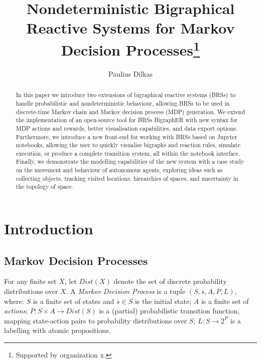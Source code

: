 \documentclass[runningheads]{llncs}
\newcommand\Dist{\mathit{Dist}}
\begin{document}
\title{Nondeterministic Bigraphical Reactive Systems for Markov Decision
  Processes\thanks{Supported by organization x.}}
\author{Paulius Dilkas}
\maketitle

\begin{abstract}
  In this paper we introduce two extensions of bigraphical reactive systems
  (BRSs) to handle probabilistic and nondeterministic behaviour, allowing BRSs
  to be used in discrete-time Markov chain and Markov decision process (MDP)
  generation. We extend the implementation of an open-source tool for BRSs
  BigraphER with new syntax for MDP actions and rewards, better visualisation
  capabilities, and data export options. Furthermore, we introduce a new
  front-end for working with BRSs based on Jupyter notebooks, allowing the user
  to quickly visualise bigraphs and reaction rules, simulate execution, or
  produce a complete transition system, all within the notebook interface.
  Finally, we demonstrate the modelling capabilities of the new system with a
  case study on the movement and behaviour of autonomous agents, exploring ideas
  such as collecting objects, tracking visited locations, hierarchies of spaces,
  and uncertainty in the topology of space.

\end{abstract}

\section{Introduction}



\subsection{Markov Decision Processes}

\begin{definition} \label{mdp}
  For any finite set $X$, let $\Dist(X)$ denote the set of discrete probability
  distributions over $X$. A \emph{Markov Decision Process} is a tuple $ (S,
  \overline{s}, A, P, L)$, where: $S$ is a finite set of states and
  $\overline{s} \in S$ is the initial state; $A$ is a finite set of
  \emph{actions}; $P : S \times A \to \Dist(S)$ is a (partial) probabilistic
  transition function, mapping state-action pairs to probability distributions
  over $S$; $L : S \to 2^P$ is a labelling with atomic propositions.
\end{definition}
\end{document}
